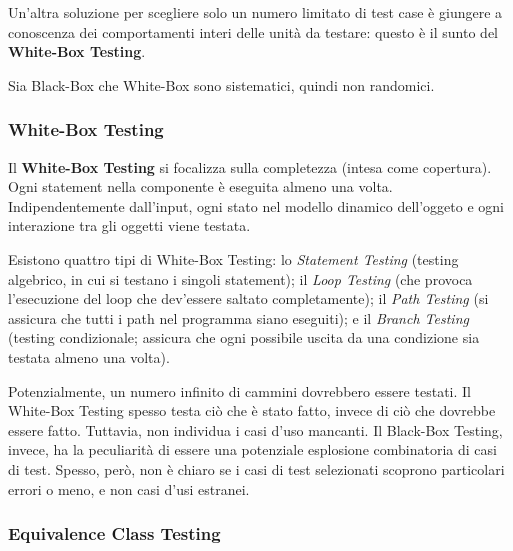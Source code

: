 \documentclass{article}
\begin{document}
            \vspace{3mm}
            
            Un'altra soluzione per scegliere solo un numero limitato di test case è giungere a conoscenza dei comportamenti interi delle unità da testare: questo è il sunto del \textbf{White-Box Testing}.
            
            \vspace{3mm}
            
            Sia Black-Box che White-Box sono sistematici, quindi non randomici. 
        
        \subsubsection{White-Box Testing}
        
            Il \textbf{White-Box Testing} si focalizza sulla completezza (intesa come copertura). Ogni statement nella componente è eseguita almeno una volta. Indipendentemente dall'input, ogni stato nel modello dinamico dell'oggeto e ogni interazione tra gli oggetti viene testata. 
            
            \vspace{3mm}
            
            Esistono quattro tipi di White-Box Testing: lo \textit{Statement Testing} (testing algebrico, in cui si testano i singoli statement); il \textit{Loop Testing} (che provoca l'esecuzione del loop che dev'essere saltato completamente); il \textit{Path Testing} (si assicura che tutti i path nel programma siano eseguiti); e il \textit{Branch Testing} (testing condizionale; assicura che ogni possibile uscita da una condizione sia testata almeno una volta).
            
            \vspace{3mm}
            
            Potenzialmente, un numero infinito di cammini dovrebbero essere testati. Il White-Box Testing spesso testa ciò che è stato fatto, invece di ciò che dovrebbe essere fatto. Tuttavia, non individua i casi d'uso mancanti. Il Black-Box Testing, invece, ha la peculiarità di essere una potenziale esplosione combinatoria di casi di test. Spesso, però, non è chiaro se i casi di test selezionati scoprono particolari errori o meno, e non casi d'usi estranei.
        
        \subsubsection{Equivalence Class Testing}
        
\end{document}
